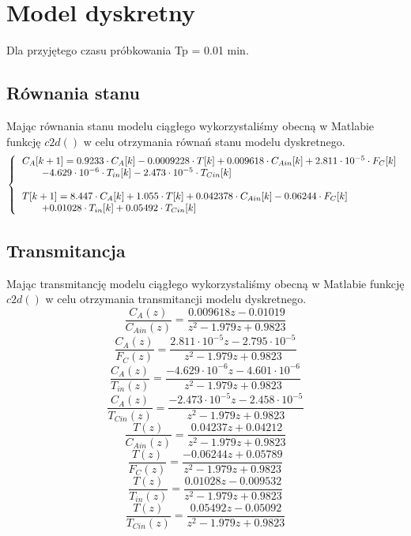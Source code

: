\chapter{Model dyskretny}
Dla przyjętego czasu próbkowania Tp = 0.01 min.
\section{Równania stanu}
Mając równania stanu modelu ciągłego wykorzystaliśmy obecną w Matlabie funkcję $c2d()$ w celu otrzymania równań stanu modelu dyskretnego.
\begin{equation}
	\left\{
	\begin{tabular}{l}
	$C_A[k+1] = 0.9233\cdot C_A[k]  -0.0009228\cdot T[k]+ 0.009618\cdot C_{Ain}[k]+  2.811\cdot 10^{-5}\cdot F_C[k]$\\
	$\quad \quad -4.629\cdot 10^{-6}\cdot T_{in}[k]  -2.473\cdot 10^{-5}\cdot T_{Cin}[k]$\\\\
	$T[k+1] = 8.447\cdot C_A[k] +1.055\cdot T[k]+ 0.042378\cdot C_{Ain}[k]-0.06244\cdot F_C[k]$\\
	$\quad \quad +0.01028\cdot T_{in}[k]  +0.05492\cdot T_{Cin}[k]$\\
	\end{tabular}
	\right.
\end{equation}
\section{Transmitancja}
Mając transmitancję modelu ciągłego wykorzystaliśmy obecną w Matlabie funkcję $c2d()$ w celu otrzymania transmitancji modelu dyskretnego.
\begin{equation}
	\frac{C_A(z)}{C_{Ain}(z)} = \frac{0.009618z-0.01019}{z^2-1.979z+0.9823}
\end{equation}
\begin{equation}
\frac{C_A(z)}{F_C(z)} = \frac{2.811\cdot10^{-5}z-2.795\cdot10^{-5}}{z^2-1.979z+0.9823}
\end{equation}
\begin{equation}
\frac{C_A(z)}{T_{in}(z)} = \frac{-4.629\cdot10^{-6} z - 4.601\cdot10^{-6}}{z^2-1.979z+0.9823}
\end{equation}
\begin{equation}
\frac{C_A(z)}{T_{Cin}(z)} = \frac{-2.473\cdot10^{-5} z - 2.458\cdot 10^{-5}}{z^2-1.979z+0.9823}
\end{equation}
\begin{equation}
\frac{T(z)}{C_{Ain}(z)} = \frac{0.04237 z + 0.04212}{z^2-1.979z+0.9823}
\end{equation}
\begin{equation}
\frac{T(z)}{F_C(z)} = \frac{-0.06244 z + 0.05789}{z^2-1.979z+0.9823}
\end{equation}
\begin{equation}
\frac{T(z)}{T_{in}(z)} = \frac{0.01028 z - 0.009532}{z^2-1.979z+0.9823}
\end{equation}
\begin{equation}
\frac{T(z)}{T_{Cin}(z)} = \frac{0.05492 z - 0.05092}{z^2-1.979z+0.9823}
\end{equation}
\newpage

